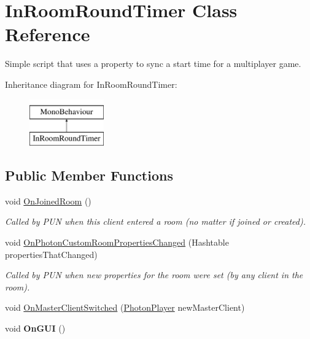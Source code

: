 \hypertarget{class_in_room_round_timer}{}\section{In\+Room\+Round\+Timer Class Reference}
\label{class_in_room_round_timer}


Simple script that uses a property to sync a start time for a multiplayer game.  


Inheritance diagram for In\+Room\+Round\+Timer\+:\begin{figure}[H]
\begin{center}
\leavevmode
\includegraphics[height=2.000000cm]{class_in_room_round_timer}
\end{center}
\end{figure}
\subsection*{Public Member Functions}
\begin{DoxyCompactItemize}
\item 
void \hyperlink{class_in_room_round_timer_a17202ffb28b9e93f1d2379d79d1e9262}{On\+Joined\+Room} ()
\begin{DoxyCompactList}\small\item\em Called by P\+UN when this client entered a room (no matter if joined or created).\end{DoxyCompactList}\item 
void \hyperlink{class_in_room_round_timer_a226f64a8398f70b91ad6af4ea3b44bd8}{On\+Photon\+Custom\+Room\+Properties\+Changed} (Hashtable properties\+That\+Changed)
\begin{DoxyCompactList}\small\item\em Called by P\+UN when new properties for the room were set (by any client in the room).\end{DoxyCompactList}\item 
void \hyperlink{class_in_room_round_timer_ae136a34f3bf637b1b5610fd202ffa1e3}{On\+Master\+Client\+Switched} (\hyperlink{class_photon_player}{Photon\+Player} new\+Master\+Client)
\item 
void {\bfseries On\+G\+UI} ()\hypertarget{class_in_room_round_timer_a1c1cc2f294b32ed4dd293db35a9f4a7f}{}\label{class_in_room_round_timer_a1c1cc2f294b32ed4dd293db35a9f4a7f}

\end{DoxyCompactItemize}
